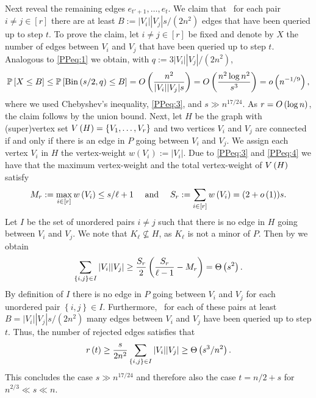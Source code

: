 Next reveal the remaining edges $e_{t'+1}, \ldots, e_t$. We claim that \whp\ for each pair $i\neq j\in[r]$ there are at least $B:=|V_i||V_j| s/\left(2n^2\right)$ edges that have been queried up to step $t$. To prove the claim, let $i\neq j\in[r]$ be fixed and denote by $X$ the number of edges between $V_i$ and $V_j$ that have been queried up to step $t$. Analogous to \eqref{PPeq:1} we obtain, with $q:=3|V_i||V_j|/\left(2n^2\right)$,
\begin{align*}
\mathbb{P}\left[X\leq B\right]\leq \mathbb{P}\left[\operatorname{Bin}\left(s/2,q\right)\leq B\right]=O\left(\frac{n^2}{|V_i||V_j|s}\right)=O\left(\frac{n^2 \log n^2}{s^3}\right)=o\left(n^{-1/9}\right),
\end{align*}
where we used Chebyshev's inequality, \eqref{PPeq:3}, and $s\gg n^{17/24}$. As $r=O\left(\log n\right)$, the claim follows by the union bound. Next, let $H$ be the graph with (super)vertex set $V\left(H\right)=\left\{V_1, \ldots, V_r\right\}$ and two vertices $V_i$ and $V_j$ are connected if and only if there is an edge in $P$ going between $V_i$ and $V_j$. We assign each vertex $V_i$ in $H$ the vertex-weight $w(V_i):=|V_i|$. Due to \eqref{PPeq:3} and \eqref{PPeq:4} we have that the maximum vertex-weight and the total vertex-weight of $V\left(H\right)$ satisfy 
\begin{align*}
M_r:=\max_{i\in[r]}w\left(V_i\right)\leq s/\ell+1 \quad \text{ and } \quad S_r:=\sum_{i\in[r]}w\left(V_i\right)=(2+o\left(1\right))s.
\end{align*}
Let $I$ be the set of unordered pairs $i\neq j$ such that there is no edge in $H$ going between $V_i$ and $V_j$. We note that $K_\ell\nsubseteq H$, as $K_\ell$ is not a minor of $P$. Then by  we obtain
\begin{align*}
\sum_{\left\{i,j\right\}\in I}|V_i||V_j|\geq \frac{S_r}{2}\left(\frac{S_r}{\ell-1}-M_r\right)=\Theta\left(s^2\right).
\end{align*}
By definition of $I$ there is no edge in $P$ going between $V_i$ and $V_j$ for each unordered pair $\left\{i,j\right\}\in I$. Furthermore, \whp\ for each of these pairs at least $B=|V_i||V_j| s/\left(2n^2\right)$ many edges between $V_i$ and $V_j$ have been queried up to step $t$. Thus, the number of rejected edges satisfies that \whp 
\begin{align*}
r\left(t\right)\geq \frac{s}{2n^2} \sum_{\left\{i,j\right\}\in I}|V_i||V_j|\geq \Theta\left(s^3/n^2\right).
\end{align*}
This concludes the case $s\gg n^{17/24}$ and therefore also the case $t=n/2+s$ for $n^{2/3}\ll s\ll n$.


